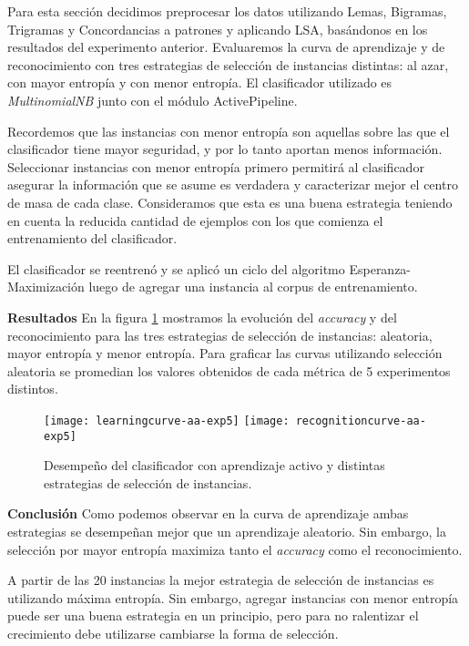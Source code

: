 Para esta sección decidimos preprocesar los datos utilizando Lemas, Bigramas, Trigramas y Concordancias a patrones y aplicando LSA, basándonos en los resultados del experimento anterior. Evaluaremos la curva de aprendizaje y de reconocimiento con tres estrategias de selección de instancias distintas: al azar, con mayor entropía y con menor entropía. El clasificador utilizado es \textit{MultinomialNB} junto con el módulo ActivePipeline.

Recordemos que las instancias con menor entropía son aquellas sobre las que el clasificador tiene mayor seguridad, y por lo tanto aportan menos información. Seleccionar instancias con menor entropía primero permitirá al clasificador asegurar la información que se asume es verdadera y caracterizar mejor el centro de masa de cada clase. Consideramos que esta es una buena estrategia teniendo en cuenta la reducida cantidad de ejemplos con los que comienza el entrenamiento del clasificador.

El clasificador se reentrenó y se aplicó un ciclo del algoritmo Esperanza-Maximización luego de agregar una instancia al corpus de entrenamiento.

\vspace{3 mm}

\textbf{Resultados} En la figura \ref{fig-aa-comparision} mostramos la evolución del \textit{accuracy} y del reconocimiento para las tres estrategias de selección de instancias: aleatoria, mayor entropía y menor entropía. Para graficar las curvas utilizando selección aleatoria se promedian los valores obtenidos de cada métrica de 5 experimentos distintos.

\begin{figure}[h!]
\centering
\texttt{[image: learningcurve-aa-exp5]}
\texttt{[image: recognitioncurve-aa-exp5]}
\caption{Desempeño del clasificador con aprendizaje activo y distintas estrategias de selección de instancias.}\label{fig-aa-comparision}
\end{figure}

\vspace{3 mm}

\textbf{Conclusión}
Como podemos observar en la curva de aprendizaje ambas estrategias se desempeñan mejor que un aprendizaje aleatorio. Sin embargo, la selección por mayor entropía maximiza tanto el \textit{accuracy} como el reconocimiento.

A partir de las 20 instancias la mejor estrategia de selección de instancias es utilizando máxima entropía. Sin embargo, agregar instancias con menor entropía puede ser una buena estrategia en un principio, pero para no ralentizar el crecimiento debe utilizarse cambiarse la forma de selección.

